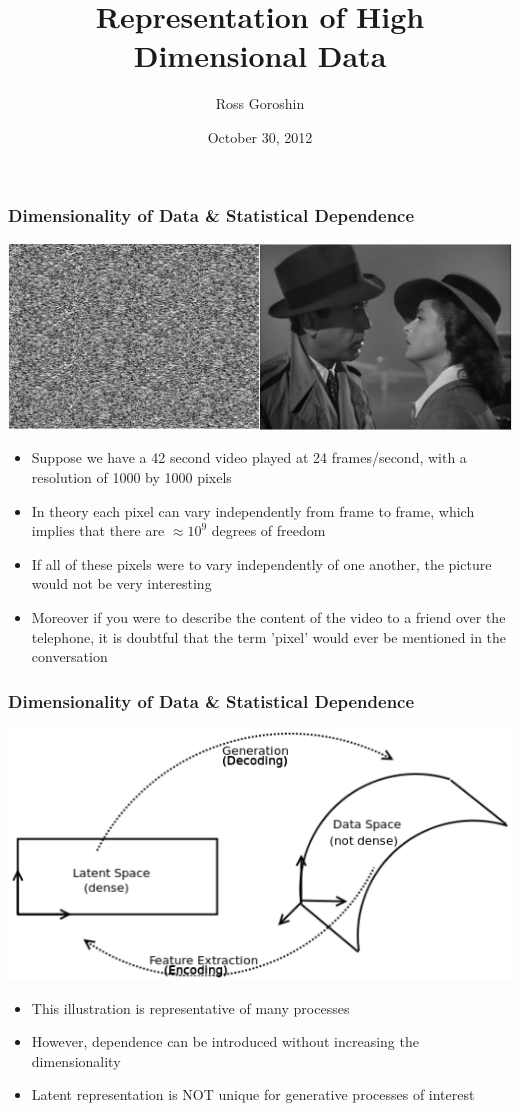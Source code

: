 \documentclass{beamer}
\title{Representation of High Dimensional Data}
\date{October 30, 2012}
\author{Ross Goroshin}
\begin{document}
\begin{frame}
\titlepage
\end{frame}

\begin{frame}
\frametitle{Dimensionality of Data \& Statistical Dependence}  
\begin{center}
\includegraphics[scale=0.125]{image.png}
\begin{itemize} 
\item Suppose we have a 42 second video played at 24 frames/second, with a resolution of 1000 by 1000 pixels
\item In theory each pixel can vary independently from frame to frame, which implies that there are $\approx 10^9$ degrees of freedom 
\item If all of these pixels were to vary independently of one another, the picture would not be very interesting
\item Moreover if you were to describe the content of the video to a friend over the telephone, it is doubtful that the term 'pixel' would ever be mentioned in the conversation 
\end{itemize} 
\end{center}
\end{frame}

\begin{frame} 
\frametitle{Dimensionality of Data \& Statistical Dependence}
\begin{center} 
\includegraphics[scale = 0.5]{spaces.png}
\end{center} 
\begin{itemize} 
\item This illustration is representative of many processes 
\item However, dependence can be introduced without increasing the dimensionality 
\item Latent representation is NOT unique for generative processes of interest
\end{itemize}  
\end{frame}
\end{document}
